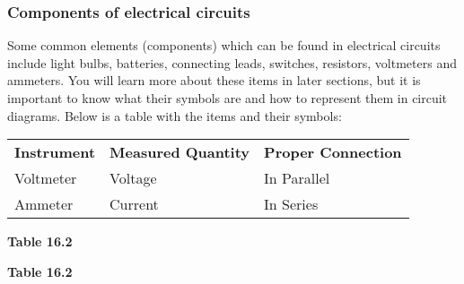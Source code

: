             \subsubsection{ Components of electrical circuits}
            \nopagebreak
          \label{m38771*id62821}Some common elements (components) which can be found in electrical circuits include light bulbs, batteries, connecting leads, switches, resistors, voltmeters and ammeters. You will learn more about these items in later sections, but it is important to know what their symbols are and how to represent them in circuit diagrams. Below is a table with the items and their symbols:\par 
          \begin{table}[H]
        \begin{center}
      \label{m38773*id67892}
    \noindent
      \tablelasttail{}
      \begin{xtabular}[t]{|l|l|l|}\hline
                  \textbf{Instrument}
                 &
                  \textbf{Measured Quantity}
                 &
                  \textbf{Proper Connection}
     \tabularnewline{}
        Voltmeter &
        Voltage &
        In Parallel%
     \tabularnewline{}
        Ammeter &
        Current &
        In Series%
     \tabularnewline{}
    \end{xtabular}
      \end{center}
    \begin{center}{\small\bfseries Table 16.2}\end{center}
    \begin{caption}{\small\bfseries Table 16.2}\end{caption}
\end{table}
    \par
  \label{m38773**end}
